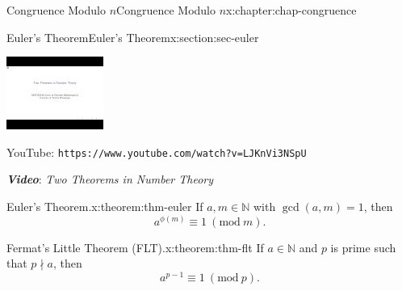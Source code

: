 \documentclass[oneside,10pt,]{book}
\newcommand{\mono}[1]{\texttt{#1}}
\newcommand{\alert}[1]{\textbf{\textit{#1}}}
\numberwithin{equation}{section}
\newlength{\qrsize}
\newlength{\previewwidth}
\newcommand{\Mod}[1]{\ \left(\mathrm{mod}\ #1\right)}
\begin{document}
\begin{chapterptx}{Congruence Modulo \(n\)}{}{Congruence Modulo \(n\)}{}{}{x:chapter:chap-congruence}
\begin{sectionptx}{Euler's Theorem}{}{Euler's Theorem}{}{}{x:section:sec-euler}
\begin{sidebyside}{1}{0}{0}{0}
\begin{sbspanel}{1}
\setlength{\previewwidth}{\linewidth}
\addtolength{\previewwidth}{-\qrsize}
\begin{tcbraster}[raster columns=2, raster column skip=1pt, raster halign=center, raster force size=false, raster left skip=0pt, raster right skip=0pt]%
\begin{tcolorbox}[previewstyle, width=\previewwidth]%
\includegraphics[width=0.80\linewidth,height=\qrsize,keepaspectratio]{images/video-two-theorems.jpg}%
\end{tcolorbox}%
\begin{tcolorbox}[qrstyle]%
{\hypersetup{urlcolor=black}}%
\end{tcolorbox}%
\begin{tcolorbox}[captionstyle]%
\small YouTube: \mono{https://www.youtube.com/watch?v=LJKnVi3NSpU}\end{tcolorbox}%
\end{tcbraster}%
\end{sbspanel}%
\end{sidebyside}%
\par
\alert{Video}: \emph{Two Theorems in Number Theory}%
\begin{theorem}{Euler's Theorem.}{}{x:theorem:thm-euler}%
If \(a, m \in \mathbb{N}\) with \(\gcd(a,m) = 1\), then%
\begin{equation*}
a^{\phi(m)} \equiv 1 \Mod{m}\text{.}
\end{equation*}
%
\end{theorem}
\begin{theorem}{Fermat's Little Theorem (FLT).}{}{x:theorem:thm-flt}%
If \(a \in \mathbb{N}\) and \(p\) is prime such that \(p \nmid a\), then%
\begin{equation*}
a^{p-1} \equiv 1 \Mod{p}\text{.}

\end{equation*}
\end{theorem}
\end{sectionptx}
\end{chapterptx}
\end{document}
